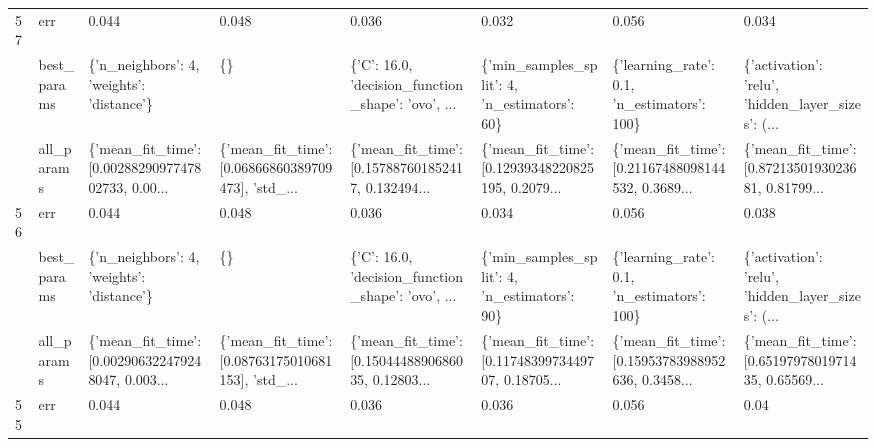 \begin{tabular}{llllllll}
57 & err &                                              0.044 &                                              0.048 &                                              0.036 &                                              0.032 &                                              0.056 &                                              0.034 \\
   & best\_params &          \{'n\_neighbors': 4, 'weights': 'distance'\} &                                                 \{\} &  \{'C': 16.0, 'decision\_function\_shape': 'ovo', ... &       \{'min\_samples\_split': 4, 'n\_estimators': 60\} &        \{'learning\_rate': 0.1, 'n\_estimators': 100\} &  \{'activation': 'relu', 'hidden\_layer\_sizes': (... \\
   & all\_params &  \{'mean\_fit\_time': [0.0028829097747802733, 0.00... &  \{'mean\_fit\_time': [0.06866860389709473], 'std\_... &  \{'mean\_fit\_time': [0.157887601852417, 0.132494... &  \{'mean\_fit\_time': [0.12939348220825195, 0.2079... &  \{'mean\_fit\_time': [0.21167488098144532, 0.3689... &  \{'mean\_fit\_time': [0.8721350193023681, 0.81799... \\
56 & err &                                              0.044 &                                              0.048 &                                              0.036 &                                              0.034 &                                              0.056 &                                              0.038 \\
   & best\_params &          \{'n\_neighbors': 4, 'weights': 'distance'\} &                                                 \{\} &  \{'C': 16.0, 'decision\_function\_shape': 'ovo', ... &       \{'min\_samples\_split': 4, 'n\_estimators': 90\} &        \{'learning\_rate': 0.1, 'n\_estimators': 100\} &  \{'activation': 'relu', 'hidden\_layer\_sizes': (... \\
   & all\_params &  \{'mean\_fit\_time': [0.002906322479248047, 0.003... &  \{'mean\_fit\_time': [0.08763175010681153], 'std\_... &  \{'mean\_fit\_time': [0.1504448890686035, 0.12803... &  \{'mean\_fit\_time': [0.1174839973449707, 0.18705... &  \{'mean\_fit\_time': [0.15953783988952636, 0.3458... &  \{'mean\_fit\_time': [0.6519797801971435, 0.65569... \\
55 & err &                                              0.044 &                                              0.048 &                                              0.036 &                                              0.036 &                                              0.056 &                                               0.04 \\

\end{tabular}
